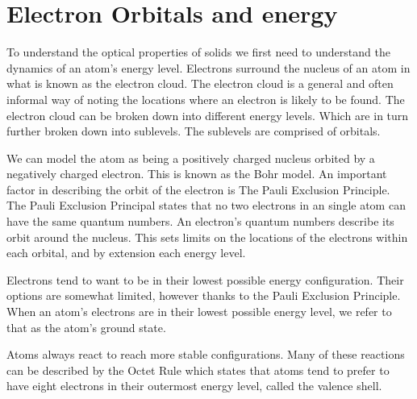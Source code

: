 \documentclass[prl,onecolumn]{revtex4-1}  %
\begin{document}
\section{Electron Orbitals and energy}
To understand the optical properties of solids we first need to understand the dynamics of an atom's energy level. Electrons surround the nucleus of an atom in what is known as the electron cloud. The electron cloud is a general and often informal way of noting the locations where an electron is likely to be found. The electron cloud can be broken down into different energy levels. Which are in turn further broken down into sublevels. The sublevels are comprised of orbitals.

\par
We can model the atom as being a positively charged nucleus orbited by a negatively charged electron. This is known as the Bohr model. An important factor in describing the orbit of the electron is The Pauli Exclusion Principle. The Pauli Exclusion Principal states that no two electrons in an single atom can have the same quantum numbers. An electron's quantum numbers describe its orbit around the nucleus. This sets limits on the locations of the electrons within each orbital, and by extension each energy level.

\par
Electrons tend to want to be in their lowest possible energy configuration. Their options are somewhat limited, however thanks to the Pauli Exclusion Principle. When an atom's electrons are in their lowest possible energy level, we refer to that as the atom's ground state. 

\par
Atoms always react to reach more stable configurations. Many of these reactions can be described by the Octet Rule which states that atoms tend to prefer to have eight electrons in their outermost energy level, called the valence shell.
\end{document}
